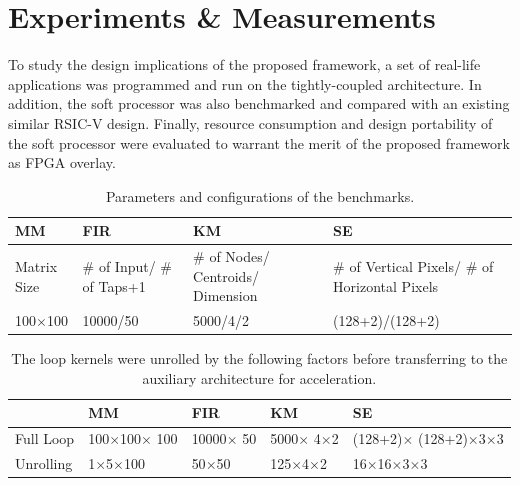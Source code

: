 \section{Experiments \& Measurements}
\label{sec:evaluation}

To study the design implications of the  proposed framework, a set of real-life applications was programmed and run on the tightly-coupled architecture. %
In addition, the soft processor was also benchmarked and compared with an existing similar RSIC-V design. Finally, resource consumption and design portability of the soft processor were evaluated to warrant the merit of the proposed framework as FPGA overlay.

\begin{table}
\begin{center}
  \caption{Parameters and configurations of the benchmarks.}
  \label{tab:tight_benchmark}

  \scriptsize
	\begin{tabular}{m{10mm}|m{16mm}|m{15mm}|m{27mm}}
    \toprule
	\bf MM  &  \bf FIR & \bf KM & \bf SE \\ 
	\hline	
	Matrix Size & \# of Input/ \# of Taps+1 & \# of Nodes/ Centroids/ Dimension & \# of Vertical Pixels/ \# of Horizontal Pixels\\
	\hline	
	100$\times$100 & 10000/50 & 5000/4/2 & (128+2)/(128+2)\\
    \bottomrule    
  \end{tabular}
\end{center}
\end{table} 

\begin{table}
\begin{center}
  \caption{The loop kernels were unrolled by the following factors before transferring to the auxiliary architecture for acceleration.}
  \label{tab:tight_unrolled}

  \scriptsize
	\begin{tabular}{m{12mm}|m{12mm}|m{11mm}|m{10mm}|m{16mm}}
    \toprule
	 & \bf MM  &  \bf FIR & \bf KM & \bf SE \\ 
	\hline	
	Full Loop & 100$\times$100$\times$ 100 & 10000$\times$ 50 & 5000$\times$ 4$\times$2 & (128+2)$\times$ (128+2)$\times$3$\times$3\\
	\hline	
	Unrolling & 1$\times$5$\times$100 & 50$\times$50 & 125$\times$4$\times$2 & 16$\times$16$\times$3$\times$3\\
    \bottomrule    
  \end{tabular}
\end{center}
\end{table} 



